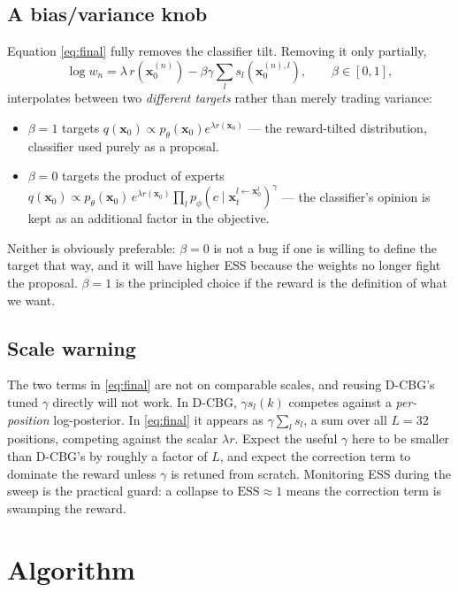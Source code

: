 \documentclass[11pt]{article}
\newcommand{\x}{\mathbf{x}}
\begin{document}
\subsection{A bias/variance knob}

Equation \eqref{eq:final} fully removes the classifier tilt. Removing it only
partially,
\begin{equation}
\log w_n = \lambda\, r(\x_0^{(n)})
  - \beta\gamma \sum_l s_l\!\left(\x_0^{(n),l}\right),
\qquad \beta \in [0, 1],
\label{eq:beta}
\end{equation}
interpolates between two \emph{different targets} rather than merely trading
variance:
\begin{itemize}
  \item $\beta = 1$ targets $q(\x_0) \propto p_\theta(\x_0) e^{\lambda r(\x_0)}$
        --- the reward-tilted distribution, classifier used purely as a
        proposal.
  \item $\beta = 0$ targets the product of experts
        $q(\x_0) \propto p_\theta(\x_0)\, e^{\lambda r(\x_0)}
        \prod_l p_\phi(c \mid \x_t^{l \leftarrow \x_0^l})^{\gamma}$
        --- the classifier's opinion is kept as an additional factor in the
        objective.
\end{itemize}
Neither is obviously preferable: $\beta = 0$ is not a bug if one is willing to
define the target that way, and it will have higher ESS because the weights no
longer fight the proposal. $\beta = 1$ is the principled choice if the reward is
the definition of what we want.

\subsection{Scale warning}

The two terms in \eqref{eq:final} are not on comparable scales, and reusing
D-CBG's tuned $\gamma$ directly will not work. In D-CBG, $\gamma s_l(k)$
competes against a \emph{per-position} log-posterior. In \eqref{eq:final} it
appears as $\gamma \sum_l s_l$, a sum over all $L = 32$ positions, competing
against the scalar $\lambda r$. Expect the useful $\gamma$ here to be smaller
than D-CBG's by roughly a factor of $L$, and expect the correction term to
dominate the reward unless $\gamma$ is retuned from scratch. Monitoring ESS
during the sweep is the practical guard: a collapse to $\mathrm{ESS} \approx 1$
means the correction term is swamping the reward.

\section{Algorithm}
\end{document}
